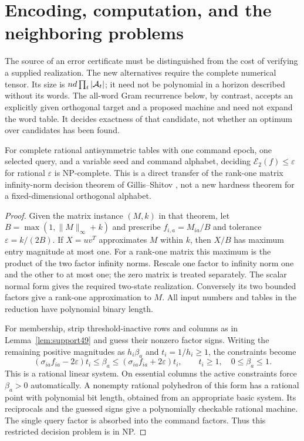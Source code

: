\section{Encoding, computation, and the neighboring problems}\label{sec:encoding49}
The source of an error certificate must be distinguished from the cost
of verifying a supplied realization. The new alternatives require the
complete numerical tensor. Its size is $n d\prod_t|\mathcal A_t|$; it need
not be polynomial in a horizon described without its words. The
all-word Gram recurrence below, by contrast, accepts an explicitly
given orthogonal target and a proposed machine and need not expand
the word table. It decides exactness of that candidate, not whether
an optimum over candidates has been found.

\begin{proposition}
\label{prop:hard49}
For complete rational antisymmetric tables with one command epoch,
one selected query, and a variable seed and command alphabet,
deciding $\mathcal E_2(f)\le\varepsilon$ for rational $\varepsilon$
is NP-complete. This is a direct transfer of the rank-one matrix
infinity-norm decision theorem of Gillis--Shitov \cite[Theorem 3]{GS19},
not a new hardness theorem for a fixed-dimensional orthogonal alphabet.
\end{proposition}
\begin{proof}
Given the matrix instance $(M,k)$ in that theorem, let
$B=\max(1,\|M\|_\infty+k)$ and prescribe $f_{i,a}=M_{ia}/B$
and tolerance $\varepsilon=k/(2B)$. If $X=uv^T$ approximates $M$
within $k$, then $X/B$ has maximum entry magnitude at most one.
For a rank-one matrix this maximum is the product of the two factor
infinity norms. Rescale one factor to infinity norm one and the
other to at most one; the zero matrix is treated separately.
The scalar normal form gives the required two-state realization.
Conversely its two bounded factors give a rank-one approximation to
$M$. All input numbers and tables in the reduction have polynomial
binary length.

For membership, strip threshold-inactive rows and columns as in
Lemma~\ref{lem:support49} and guess their nonzero factor signs.
Writing the remaining positive magnitudes as $h_i\beta_a$ and
$t_i=1/h_i\ge1$, the constraints become
\[
 (\sigma_{ia}f_{ia}-2\varepsilon)t_i\le\beta_a
 \le(\sigma_{ia}f_{ia}+2\varepsilon)t_i,
 \qquad t_i\ge1,\quad0\le\beta_a\le1.
\]
This is a rational linear system. On essential columns the active
constraints force $\beta_a>0$ automatically. A nonempty rational
polyhedron of this form has a rational point with polynomial bit
length, obtained from an appropriate basic system. Its reciprocals
and the guessed signs give a polynomially checkable rational machine.
The single query factor is absorbed into the command factors.
Thus this restricted decision problem is in NP.
\end{proof}

